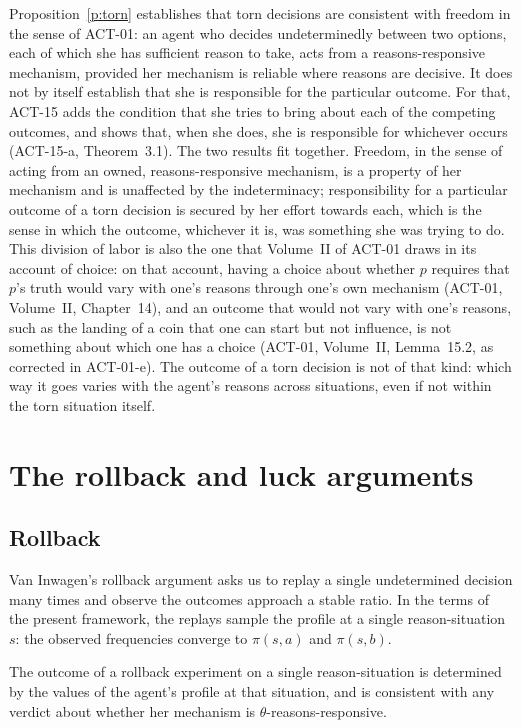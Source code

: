 \documentclass{situationist-preprint}
\begin{document}
Proposition~\ref{p:torn} establishes that torn decisions are consistent with freedom in the sense of ACT-01: an agent who decides undeterminedly between two options, each of which she has sufficient reason to take, acts from a reasons-responsive mechanism, provided her mechanism is reliable where reasons are decisive. It does not by itself establish that she is responsible for the particular outcome. For that, ACT-15 adds the condition that she tries to bring about each of the competing outcomes, and shows that, when she does, she is responsible for whichever occurs (ACT-15-a, Theorem~3.1). The two results fit together. Freedom, in the sense of acting from an owned, reasons-responsive mechanism, is a property of her mechanism and is unaffected by the indeterminacy; responsibility for a particular outcome of a torn decision is secured by her effort towards each, which is the sense in which the outcome, whichever it is, was something she was trying to do. This division of labor is also the one that Volume~II of ACT-01 draws in its account of choice: on that account, having a choice about whether $p$ requires that $p$'s truth would vary with one's reasons through one's own mechanism (ACT-01, Volume~II, Chapter~14), and an outcome that would not vary with one's reasons, such as the landing of a coin that one can start but not influence, is not something about which one has a choice (ACT-01, Volume~II, Lemma~15.2, as corrected in ACT-01-e). The outcome of a torn decision is not of that kind: which way it goes varies with the agent's reasons across situations, even if not within the torn situation itself.

\section{The rollback and luck arguments}\label{s:rollback}

\subsection{Rollback}

Van Inwagen's rollback argument asks us to replay a single undetermined decision many times and observe the outcomes approach a stable ratio. In the terms of the present framework, the replays sample the profile at a single reason-situation $s$: the observed frequencies converge to $\pi(s,a)$ and $\pi(s,b)$.

\begin{proposition}\label{p:rollback}
The outcome of a rollback experiment on a single reason-situation is determined by the values of the agent's profile at that situation, and is consistent with any verdict about whether her mechanism is $\theta$-reasons-responsive.
\end{proposition}
\end{document}
